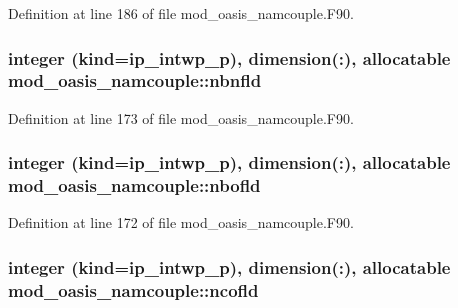 Definition at line 186 of file mod\+\_\+oasis\+\_\+namcouple.\+F90.

\hypertarget{classmod__oasis__namcouple_af0c7b1e7e49159c6b9c0dc3663264346}{
\subsubsection[{nbnfld}]{\setlength{\rightskip}{0pt plus 5cm}integer (kind=ip\+\_\+intwp\+\_\+p), dimension(\+:), allocatable mod\+\_\+oasis\+\_\+namcouple\+::nbnfld\hspace{0.3cm}{\ttfamily [private]}}}\label{classmod__oasis__namcouple_af0c7b1e7e49159c6b9c0dc3663264346}


Definition at line 173 of file mod\+\_\+oasis\+\_\+namcouple.\+F90.

\hypertarget{classmod__oasis__namcouple_a21400200658d24cbf7484b5eb177c911}{
\subsubsection[{nbofld}]{\setlength{\rightskip}{0pt plus 5cm}integer (kind=ip\+\_\+intwp\+\_\+p), dimension(\+:), allocatable mod\+\_\+oasis\+\_\+namcouple\+::nbofld\hspace{0.3cm}{\ttfamily [private]}}}\label{classmod__oasis__namcouple_a21400200658d24cbf7484b5eb177c911}


Definition at line 172 of file mod\+\_\+oasis\+\_\+namcouple.\+F90.

\hypertarget{classmod__oasis__namcouple_a9f8a2a4f44b1c56860fef8df014339d3}{
\subsubsection[{ncofld}]{\setlength{\rightskip}{0pt plus 5cm}integer (kind=ip\+\_\+intwp\+\_\+p), dimension(\+:), allocatable mod\+\_\+oasis\+\_\+namcouple\+::ncofld\hspace{0.3cm}{\ttfamily [private]}}}\label{classmod__oasis__namcouple_a9f8a2a4f44b1c56860fef8df014339d3}


